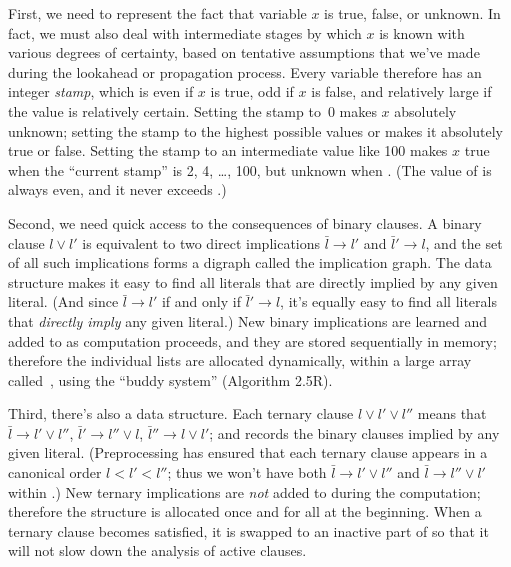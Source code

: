 First, we need to represent the fact that variable $x$ is true, false,
or unknown. In fact, we must also deal with intermediate stages by which $x$
is known with various degrees of certainty, based on tentative assumptions
that we've made during the lookahead or propagation process. Every variable
therefore has an integer {\it stamp}, which is even if $x$ is true, odd if $x$
is false, and relatively large if the value is relatively certain. Setting the
stamp to~0 makes $x$ absolutely unknown; setting the stamp to the highest
possible values  or  makes it
absolutely true or
false. Setting the stamp to an intermediate value like 100 makes $x$ true when
the ``current stamp''  is 2, 4, \dots, 100, but unknown when .
(The value of  is always even, and it never exceeds .)

Second, we need quick access to the consequences of binary clauses.
A binary clause $l\lor l'$ is equivalent to two direct implications
$\bar l\to l'$ and $\bar l'\to l$, and the set of all such implications forms
a digraph called the implication graph. The  data structure makes
it
easy to find all literals that are directly implied by any given literal.
(And since $\bar l\to l'$ if and only if $\bar l'\to l$, it's equally
easy to find all literals that {\it directly imply\/} any given literal.)
New binary implications are learned and added to  as computation
proceeds, and they are stored sequentially in memory; therefore the
individual lists are allocated dynamically, within a large array
called~, using the ``buddy system'' (Algorithm 2.5R).

Third, there's also a  data structure. Each ternary clause
$l\lor l'\lor l''$ means that $\bar l\to l'\lor l''$, $\bar l'\to l''\lor l$,
$\bar l''\to l\lor l'$; and  records the binary clauses implied by
any
given literal. (Preprocessing has ensured that each ternary clause appears in a
canonical order $l<l'<l''$; thus we won't have both $\bar l\to l'\lor l''$
and $\bar l\to l''\lor l'$ within .) New ternary implications are
{\it not\/} added to  during the computation; therefore the 
structure is allocated once and for all at the beginning.
When a ternary clause becomes satisfied, it is swapped to an inactive
part of  so that it will not slow down the analysis
of active clauses.

